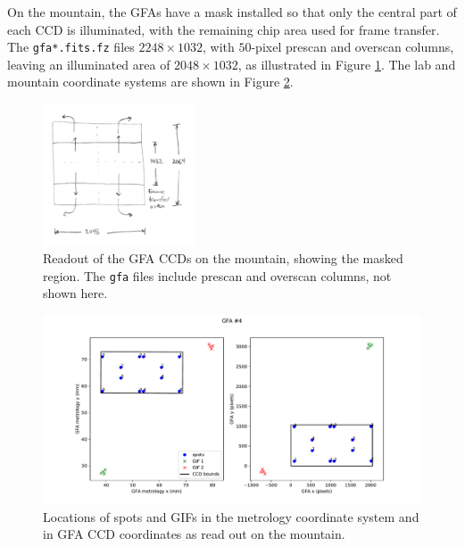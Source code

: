 \documentclass[10pt]{article}
\newcommand{\code}[1]{\texttt{#1}}
\begin{document}
On the mountain, the GFAs have a mask installed so that only the
central part of each CCD is illuminated, with the remaining chip area
used for frame transfer.  The \code{gfa*.fits.fz} files $2248 \times
1032$, with $50$-pixel prescan and overscan columns, leaving an
illuminated area of $2048 \times 1032$, as illustrated in Figure
\ref{fig:mountain}.  The lab and mountain coordinate systems are shown
in Figure \ref{fig:spots}.

\begin{figure}[h!]
  \begin{center}
    \includegraphics[width=0.4\textwidth]{gfa-metrology2.jpeg}
  \end{center}
  \caption{\label{fig:mountain}Readout of the GFA CCDs on the
    mountain, showing the masked region.  The \code{gfa} files include
    prescan and overscan columns, not shown here.}
\end{figure}

\begin{figure}[h!]
  \begin{center}
    \includegraphics[width=\textwidth]{gfa-spots}
  \end{center}
  \caption{\label{fig:spots}Locations of spots and GIFs in the metrology coordinate
    system and in GFA CCD coordinates as read out on the mountain.}
\end{figure}
\end{document}
